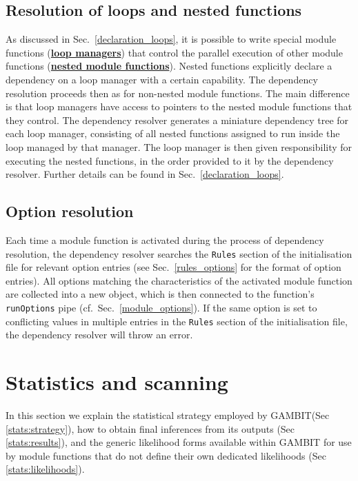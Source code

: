 \documentclass[pdftex,twocolumn,epjc3_preprint,runningheads]{svjour3}
\renewcommand{\_}{\discretionary{\underscore}{}{\underscore}}
\newcommand\cpp[1]{{\lstinline!#1!}}  %
\newcommand\yaml[1]{{\lstset{style=yaml}\lstinline!#1!\lstset{style=cpp}}}
\newcommand{\doublecross}[2]{\hyperref[#2]{\textbf{#1}}}
\newcommand{\gambit}{\textsf{GAMBIT}\xspace}
\newcommand{\GB}{\gambit}
\begin{document}
\subsection{Resolution of loops and nested functions}

As discussed in Sec.~\ref{declaration_loops}, it is possible to write
special module functions (\doublecross{loop managers}{loop manager}) that control the parallel
execution of other module functions (\doublecross{nested module functions}{nested module function}).  Nested functions
explicitly declare a dependency on a loop manager with a certain capability.
The dependency resolution proceeds then as for non-nested module functions.
The main difference is that loop managers have access to pointers to the nested
module functions that they control.  The dependency resolver generates a miniature dependency
tree for each loop manager, consisting of all nested functions assigned to run inside the loop managed by that manager.
The loop manager is then given responsibility for executing the nested functions, in the order provided to it by the
dependency resolver.  Further details can be found in Sec.~\ref{declaration_loops}.


\subsection{Option resolution}

Each time a module function is activated during the process of dependency
resolution, the dependency resolver searches the \yaml{Rules} section of the initialisation file for relevant option entries (see Sec.~\ref{rules_options} for the format of option entries). All
options matching the characteristics of the activated module function are collected into a new object, which is then connected to the function's \cpp{runOptions} pipe (cf.~Sec.\ \ref{module_options}).  If
the same option is set to conflicting values in multiple entries in the \yaml{Rules} section of the initialisation file, the dependency resolver will throw an error.


\section{Statistics and scanning}
\label{stats}

In this section we explain the statistical strategy employed by \GB (Sec \ref{stats:strategy}), how to obtain final inferences from its outputs (Sec \ref{stats:results}), and the generic likelihood forms available within \GB for use by module functions that do not define their own dedicated likelihoods (Sec \ref{stats:likelihoods}).
\end{document}
